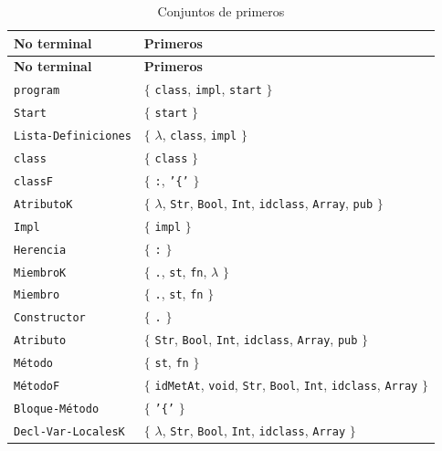 \begingroup
\small
\renewcommand{\arraystretch}{1.2}
\setlength{\tabcolsep}{5pt}
\setlength{\LTleft}{0pt}
\setlength{\LTright}{0pt plus 1fill}
\begin{longtable}{|
>{\raggedright\arraybackslash}p{}|
>{\raggedright\arraybackslash}p{}|}
\caption{Conjuntos de primeros}
\label{tab:primeros}\\
\hline
\textbf{No terminal} & \textbf{Primeros} \\ \hline
\endfirsthead
\hline
\textbf{No terminal} & \textbf{Primeros} \\ \hline
\endhead
\texttt{program} & \(\{\) \texttt{class}, \texttt{impl}, \texttt{start} \(\}\) \\ \hline
\texttt{Start} & \(\{\) \texttt{start} \(\}\) \\ \hline
\texttt{Lista-Definiciones} & \(\{\) \(\lambda\), \texttt{class}, \texttt{impl} \(\}\) \\ \hline
\texttt{class} & \(\{\) \texttt{class} \(\}\) \\ \hline
\texttt{classF} & \(\{\) \texttt{:}, \texttt{'\{'} \(\}\) \\ \hline
\texttt{AtributoK} & \(\{\) \(\lambda\), \texttt{Str}, \texttt{Bool}, \texttt{Int}, \texttt{idclass}, \texttt{Array}, \texttt{pub} \(\}\) \\ \hline
\texttt{Impl} & \(\{\) \texttt{impl} \(\}\) \\ \hline
\texttt{Herencia} & \(\{\) \texttt{:} \(\}\) \\ \hline
\texttt{MiembroK} & \(\{\) \texttt{.}, \texttt{st}, \texttt{fn}, \(\lambda\) \(\}\) \\ \hline
\texttt{Miembro} & \(\{\) \texttt{.}, \texttt{st}, \texttt{fn} \(\}\) \\ \hline
\texttt{Constructor} & \(\{\) \texttt{.} \(\}\) \\ \hline
\texttt{Atributo} & \(\{\) \texttt{Str}, \texttt{Bool}, \texttt{Int}, \texttt{idclass}, \texttt{Array}, \texttt{pub} \(\}\) \\ \hline
\texttt{Método} & \(\{\) \texttt{st}, \texttt{fn} \(\}\) \\ \hline
\texttt{MétodoF} & \(\{\) \texttt{idMetAt}, \texttt{void}, \texttt{Str}, \texttt{Bool}, \texttt{Int}, \texttt{idclass}, \texttt{Array} \(\}\) \\ \hline
\texttt{Bloque-Método} & \(\{\) \texttt{'\{'} \(\}\) \\ \hline
\texttt{Decl-Var-LocalesK} & \(\{\) \(\lambda\), \texttt{Str}, \texttt{Bool}, \texttt{Int}, \texttt{idclass}, \texttt{Array} \(\}\) \\ \hline

\end{longtable}
